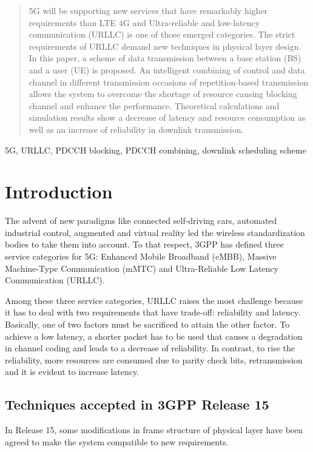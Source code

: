\documentclass[conference]{IEEEtran}
\begin{document}
\begin{abstract}
5G will be supporting new services that have remarkably higher requirements than LTE 4G and Ultra-reliable and low-latency communication (URLLC) is one of those emerged categories. The strict requirements of URLLC demand new techniques in physical layer design. In this paper, a scheme of data transmission between a base station (BS) and a user (UE) is proposed. An intelligent combining of control and data channel in different transmission occasions of repetition-based transmission allows the system to overcome the shortage of resource causing blocking channel and enhance the performance. Theoretical calculations and simulation results show a decrease of latency and resource consumption as well as an increase of reliability in downlink transmission.  
\end{abstract}

\begin{IEEEkeywords}
5G, URLLC, PDCCH blocking, PDCCH combining, downlink scheduling scheme 
\end{IEEEkeywords}

\section{Introduction}
The advent of new paradigms like connected self-driving cars, automated industrial control, augmented and virtual reality led the wireless standardization bodies to take them into account. To that respect, 3GPP has defined three service categories for 5G: Enhanced Mobile Broadband (eMBB), Massive Machine-Type Communication (mMTC) and Ultra-Reliable Low Latency Communication (URLLC). 

Among these three service categories, URLLC raises the most challenge because it has to deal with two requirements that have trade-off: reliability and latency. Basically, one of two factors must be sacrificed to attain the other factor. To achieve a low latency, a shorter packet has to be used that causes a degradation in channel coding and leads to a decrease of reliability. In contrast, to rise the reliability, more resources are consumed due to parity check bits, retransmission and it is evident to increase latency.

\subsection{Techniques accepted in 3GPP Release 15}\label{IAA}
In Release 15, some modifications in frame structure of physical layer have been agreed to make the system compatible to new requirements. 
\end{document}

